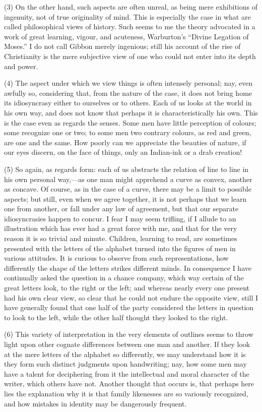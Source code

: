 (3) On the other hand, such aspects are often unreal, as
being mere exhibitions of ingenuity, not of true originality of mind.
This is especially the case in what are called philosophical views of
history. Such seems to me the theory advocated in a work of great
learning, vigour, and acuteness, Warburton's ``Divine Legation of
Moses.'' I do not call Gibbon merely ingenious; still his account
of the rise of Christianity is the mere subjective view of one who
could not enter into its depth and power.

(4) The aspect under which we view things is often intensely
personal; nay, even awfully so, considering that, from the nature of
the case, it does not bring home its idiosyncrasy either to ourselves
or to others. Each of us looks at the world in his own way, and does
not know that perhaps it is characteristically his own. This is the
case even as regards the senses. Some men have little perception of
colours; some recognize one or two; to some men two contrary colours,
as red and green, are one and the same. How poorly can we appreciate
the beauties of nature, if our eyes discern, on the face of things,
only an Indian-ink or a drab creation!

(5) So again, as regards form: each of us abstracts the relation of
line to line in his own personal way,—as one man might apprehend a
curve as convex, another as concave. Of course, as in the case of a
curve, there may be a limit to possible aspects; but still, even when
we agree together, it is not perhaps that we learn one from another,
or fall under any law of agreement, but that our separate
idiosyncrasies happen to concur. I fear I may seem trifling, if I
allude to an illustration which has ever had a great force with me,
and that for the very reason it is so trivial and minute.
Children, learning to read, are sometimes presented with the letters
of the alphabet turned into the figures of men in various attitudes.
It is curious to observe from such representations, how differently
the shape of the letters strikes different minds. In consequence I
have continually asked the question in a chance company, which way
certain of the great letters look, to the right or the left; and
whereas nearly every one present had his own clear view, so clear that
he could not endure the opposite view, still I have generally found
that one half of the party considered the letters in question to look
to the left, while the other half thought they looked to the right.

(6) This variety of interpretation in the very elements of outlines
seems to throw light upon other cognate differences between one man
and another. If they look at the mere letters of the alphabet so
differently, we may understand how it is they form such distinct
judgments upon handwriting; nay, how some men may have a talent for
deciphering from it the intellectual and moral character of the
writer, which others have not. Another thought that occurs is, that
perhaps here lies the explanation why it is that family likenesses are
so variously recognized, and how mistakes in identity may be
dangerously frequent.

